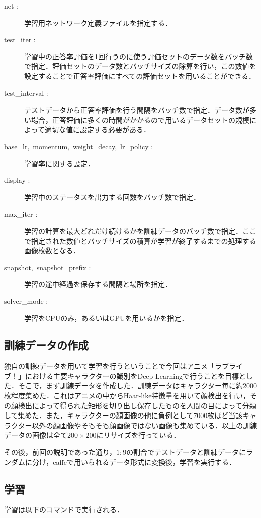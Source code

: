 \documentclass[a4paper,10pt]{jsarticle}
\begin{document}
\begin{description}
  \item[net :]学習用ネットワーク定義ファイルを指定する．
  \item[test\_iter :]学習中の正答率評価を1回行うのに使う評価セットのデータ数をバッチ数で指定．評価セットのデータ数とバッチサイズの除算を行い，この数値を設定することで正答率評価にすべての評価セットを用いることができる．
  \item[test\_interval :]テストデータから正答率評価を行う間隔をバッチ数で指定．データ数が多い場合，正答評価に多くの時間がかかるので用いるデータセットの規模によって適切な値に設定する必要がある．
  \item[base\_lr,\ momentum,\ weight\_decay,\ lr\_policy :]学習率に関する設定．
  \item[display :]学習中のステータスを出力する回数をバッチ数で指定．
  \item[max\_iter :]学習の計算を最大どれだけ続けるかを訓練データのバッチ数で指定．ここで指定された数値とバッチサイズの積算が学習が終了するまでの処理する画像枚数となる．
  \item[snapshot,\ snapshot\_prefix :]学習の途中経過を保存する間隔と場所を指定．
  \item[solver\_mode :]学習をCPUのみ，あるいはGPUを用いるかを指定．
\end{description}

\subsection{訓練データの作成}
独自の訓練データを用いて学習を行うということで今回はアニメ「ラブライブ！」における主要キャラクターの識別をDeep Learningで行うことを目標とした．そこで，まず訓練データを作成した．訓練データはキャラクター毎に約2000枚程度集めた．これはアニメの中からHaar-like特徴量を用いて顔検出を行い，その顔検出によって得られた矩形を切り出し保存したものを人間の目によって分類して集めた．また，キャラクターの顔画像の他に負例として7000枚ほど当該キャラクター以外の顔画像やそもそも顔画像ではない画像も集めている．以上の訓練データの画像は全て$200\times200$にリサイズを行っている．


その後，前回の説明であった通り，$1:9$の割合でテストデータと訓練データにランダムに分け，caffeで用いられるデータ形式に変換後，学習を実行する．

\subsection{学習}
学習は以下のコマンドで実行される．
\end{document}
